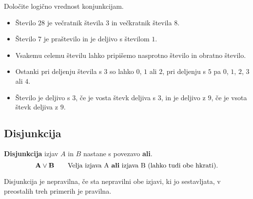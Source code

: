 

         

         
             \begin{naloga}
                Določite logično vrednost konjunkcijam.
                \begin{itemize}
                    \item Število $28$ je večratnik števila $3$ in večkratnik števila $8$.
                    \item Število $7$ je praštevilo in je deljivo s številom $1$.
                    \item Vsakemu celemu številu lahko pripišemo nasprotno število in obratno število.
                    \item Ostanki pri deljenju števila s $3$ so lahko $0$, $1$ ali $2$, 
                        pri deljenju s $5$ pa $0$, $1$, $2$, $3$ ali $4$.
                    \item Število je deljivo s $3$, če je vosta števk deljiva s $3$, in je 
                        deljivo z $9$, če je vsota števk deljiva z $9$.
                \end{itemize}
            \end{naloga}
         

         
             \subsection{Disjunkcija}
                \textbf{Disjunkcija} izjav $A$ in $B$ nastane s povezavo \textbf{ali}.
                $$ \mathbf{A\lor B} \quad \quad \textmd{Velja izjava A \textbf{ali} izjava B 
                (lahko tudi obe hkrati).}$$
             
                      
                        Disjunkcija je nepravilna, če sta nepravilni obe izjavi, ki jo sestavljata,
                        v preostalih treh primerih je pravilna.
                     

